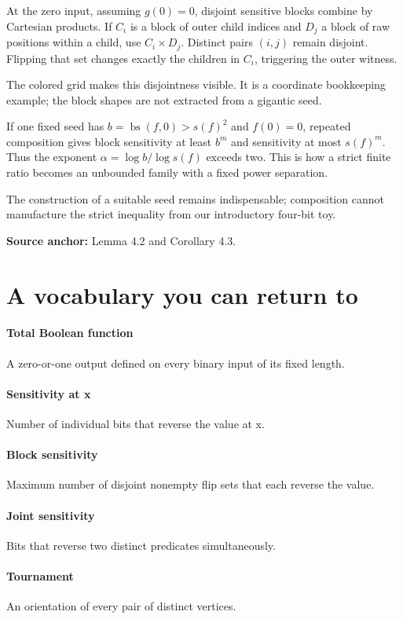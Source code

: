 \documentclass[11pt]{article}
\begin{document}
At the zero input, assuming $g(0)=0$, disjoint sensitive blocks combine by Cartesian products. If $C_i$ is a block of outer child indices and $D_j$ a block of raw positions within a child, use $C_i\times D_j$. Distinct pairs $(i,j)$ remain disjoint. Flipping that set changes exactly the children in $C_i$, triggering the outer witness.

The colored grid makes this disjointness visible. It is a coordinate bookkeeping example; the block shapes are not extracted from a gigantic seed.

If one fixed seed has $b=\operatorname{bs}(f,0)>s(f)^2$ and $f(0)=0$, repeated composition gives block sensitivity at least $b^m$ and sensitivity at most $s(f)^m$. Thus the exponent $\alpha=\log b/\log s(f)$ exceeds two. This is how a strict finite ratio becomes an unbounded family with a fixed power separation.

The construction of a suitable seed remains indispensable; composition cannot manufacture the strict inequality from our introductory four-bit toy.
{\footnotesize\color{blue}\textbf{Source anchor:} Lemma 4.2 and Corollary 4.3.\par}
\newpage\section*{A vocabulary you can return to}
\paragraph{Total Boolean function}A zero-or-one output defined on every binary input of its fixed length.
\paragraph{Sensitivity at x}Number of individual bits that reverse the value at x.
\paragraph{Block sensitivity}Maximum number of disjoint nonempty flip sets that each reverse the value.
\paragraph{Joint sensitivity}Bits that reverse two distinct predicates simultaneously.
\paragraph{Tournament}An orientation of every pair of distinct vertices.
\end{document}

